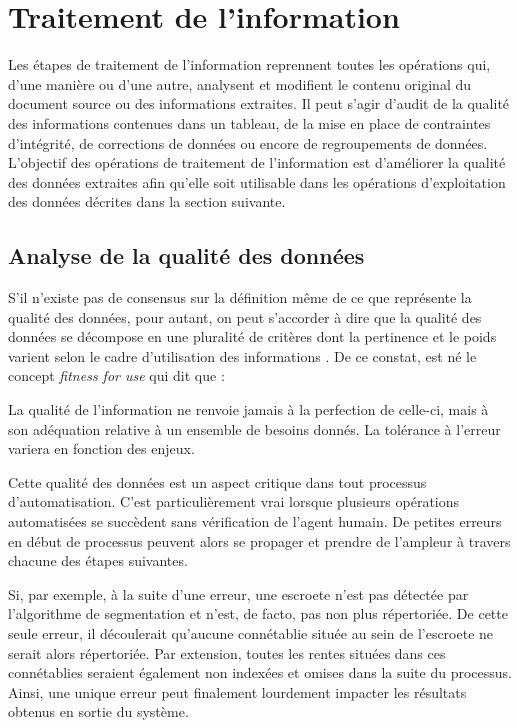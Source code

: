 \section{Traitement de l'information}
Les étapes de traitement de l'information reprennent toutes les opérations qui, d'une manière ou d'une autre, analysent et modifient le contenu original du document source ou des informations extraites. Il peut s'agir d'audit de la qualité des informations contenues dans un tableau, de la mise en place de contraintes d'intégrité, de corrections de données ou encore de regroupements de données. 
L'objectif des opérations de traitement de l'information est d'améliorer la qualité des données extraites afin qu'elle soit utilisable dans les opérations d'exploitation des données décrites dans la section suivante.

\subsection{Analyse de la qualité des données}
S'il n'existe pas de consensus sur la définition même de ce que représente la qualité des données, pour autant, on peut s'accorder à dire que la qualité des données se décompose en une pluralité de critères dont la pertinence et le poids varient selon le cadre d'utilisation des informations \parencite{berti-equille_qualite_2004}. De ce constat, est né le concept \textit{fitness for use} qui dit que :
\begin{displayquote}
    \og La qualité de l'information ne renvoie jamais à la perfection de celle-ci, mais à son adéquation relative à un ensemble de besoins donnés. La tolérance à l'erreur variera en fonction des enjeux.\fg{} 
\end{displayquote} 
\vspace{0,5cm}

Cette qualité des données est un aspect critique dans tout processus d'automatisation. C'est particulièrement vrai lorsque plusieurs opérations automatisées se succèdent sans vérification de l'agent humain. De petites erreurs en début de processus peuvent alors se propager et prendre de l'ampleur à travers chacune des étapes suivantes. 

Si, par exemple, à la suite d'une erreur, une escroete n'est pas détectée par l'algorithme de segmentation et n'est, de facto,  pas non plus répertoriée. De cette seule erreur, il découlerait qu'aucune connétablie située au sein de l'escroete ne serait alors répertoriée. Par extension, toutes les rentes situées dans ces connétablies seraient également non indexées et omises dans la suite du processus. Ainsi, une unique erreur peut finalement lourdement impacter les résultats obtenus en sortie du système.

